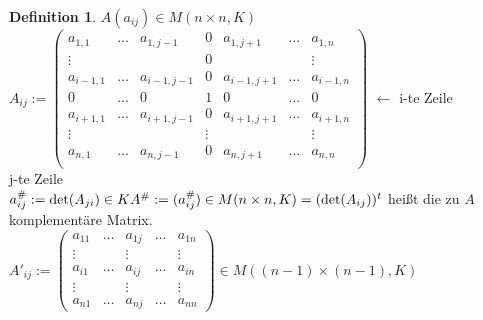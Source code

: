 \documentclass[10pt,a4paper,numbers=endperiod]{scrartcl}
\theoremstyle{definition}
\newtheorem{defi}[satz]{Definition}
\begin{document}
\begin{defi}
	$A (a_{ij}) \in M(n\times n, K)$\\
	
	$A_{ij} := \begin{pmatrix}
	a_{1,1}& \dots& a_{1,j-1} & 0 & a_{1,j+1} & \dots& a_{1,n}\\
	\vdots & & &0 &&&\vdots\\
	a_{i-1,1} & \dots &a_{i-1, j-1} &0 & a_{i-1,j+1} & \dots & a_{i-1,n}\\
	0 & \dots&0&1&0 & \dots &0\\
	a_{i+1,1} &\dots & a_{i+1, j-1} & 0 & a_{i+1,j+1}& \dots & a_{i+1,n}\\
	\vdots &&&\vdots &&&\vdots\\
	a_{n,1}& \dots&  a_{n,j-1} & 0 & a_{n,j+1} & \dots& a_{n,n}\\ 
	\end{pmatrix}$ $\leftarrow$ i-te Zeile\\
	\hspace*{47 mm} j-te Zeile\\
	
	$a_{ij}^\# := \det(A_{ji}) \in K\\
	A^\# := (a_{ij}^\#) \in M(n \times n, K) = (\det(A_{ij}))^t$ heißt die zu $A$ komplementäre Matrix.\\
	
	$A'_{ij} := \begin{pmatrix}
	a_{11} &\dots &a_{1j}& \dots& a_{1n}\\
	\vdots & & \vdots & &\vdots\\
	a_{i1}& \dots& a_{ij}& \dots& a_{in}\\
	\vdots &&\vdots &&\vdots\\
	a_{n1} &\dots &a_{nj} & \dots & a_{nn}
	\end{pmatrix} \in M((n-1) \times (n-1), K)$\\
\end{defi}
\newpage	
\end{document}
